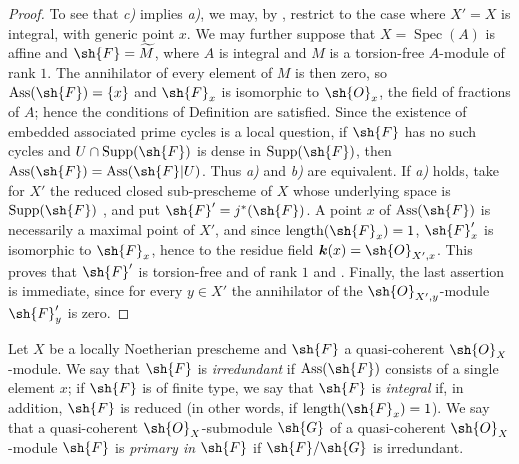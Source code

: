 \begin{proof}
To see that \emph{c)} implies \emph{a)}, we may, by , restrict to the case where $X'=X$ is integral, with generic point $x$.  We may further suppose that $X=\operatorname{Spec}(A)$ is affine and $\sh{F}=\widetilde{M}$, where $A$ is integral and $M$ is a torsion-free $A$-module of rank $1$.  The annihilator of every element of $M$ is then zero, so $\operatorname{Ass}(\sh{F})=\{x\}$ and $\sh{F}_x$ is isomorphic to $\sh{O}_x$, the field of fractions of $A$; hence the conditions of Definition  are satisfied.
Since the existence of embedded associated prime cycles is a local question, if $\sh{F}$ has no such cycles and $U\cap\operatorname{Supp}(\sh{F})$ is dense in $\operatorname{Supp}(\sh{F})$, then $\operatorname{Ass}(\sh{F})=\operatorname{Ass}(\sh{F}|U)$.  Thus \emph{a)} and \emph{b)} are equivalent.
If \emph{a)} holds, take for $X'$ the reduced closed sub-prescheme of $X$ whose underlying space is $\operatorname{Supp}(\sh{F})$ , and put $\sh{F}'=j^*(\sh{F})$.  A point $x$ of $\operatorname{Ass}(\sh{F})$ is necessarily a maximal point of $X'$, and since $\operatorname{length}(\sh{F}_x)=1$, $\sh{F}'_x$ is isomorphic to $\sh{F}_x$, hence to the residue field $\boldsymbol{k}(x)=\sh{O}_{X',x}$.  This proves that $\sh{F}'$ is torsion-free and of rank $1$  and .
Finally, the last assertion is immediate, since for every $y\in X'$ the annihilator of the $\sh{O}_{X',y}$-module $\sh{F}'_y$ is zero.
\end{proof}

\begin{definition}[3.2.4]
\label{IV.3.2.4}
Let $X$ be a locally Noetherian prescheme and $\sh{F}$ a quasi-coherent $\sh{O}_X$-module.
We say that $\sh{F}$ is \emph{irredundant} if $\operatorname{Ass}(\sh{F})$ consists of a single element $x$; if $\sh{F}$ is of finite type, we say that $\sh{F}$ is \emph{integral} if, in addition, $\sh{F}$ is reduced (in other words, if $\operatorname{length}(\sh{F}_x)=1$).
We say that a quasi-coherent $\sh{O}_X$-submodule $\sh{G}$ of a quasi-coherent $\sh{O}_X$-module $\sh{F}$ is \emph{primary in $\sh{F}$} if $\sh{F}/\sh{G}$ is irredundant.
\end{definition}

